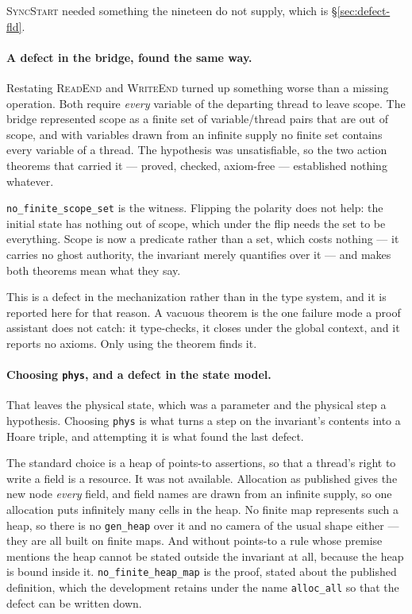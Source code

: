 \textsc{SyncStart} needed something the nineteen do not supply, which is
\S\ref{sec:defect-fld}.

\paragraph{A defect in the bridge, found the same way.}
Restating \textsc{ReadEnd} and \textsc{WriteEnd} turned up something worse than
a missing operation.  Both require \emph{every} variable of the departing
thread to leave scope.  The bridge represented scope as a finite set of
variable/thread pairs that are out of scope, and with variables drawn from an
infinite supply no finite set contains every variable of a thread.  The
hypothesis was unsatisfiable, so the two action theorems that carried it ---
proved, checked, axiom-free --- established nothing whatever.

\texttt{no\_finite\_scope\_set} is the witness.  Flipping the polarity does not
help: the initial state has nothing out of scope, which under the flip needs the
set to be everything.  Scope is now a predicate rather than a set, which costs
nothing --- it carries no ghost authority, the invariant merely quantifies over
it --- and makes both theorems mean what they say.

This is a defect in the mechanization rather than in the type system, and it is
reported here for that reason.  A vacuous theorem is the one failure mode a
proof assistant does not catch: it type-checks, it closes under the global
context, and it reports no axioms.  Only using the theorem finds it.

\paragraph{Choosing \texttt{phys}, and a defect in the state model.}
That leaves the physical state, which was a parameter and the physical step a
hypothesis.  Choosing \texttt{phys} is what turns a step on the invariant's
contents into a Hoare triple, and attempting it is what found the last defect.

The standard choice is a heap of points-to assertions, so that a thread's right
to write a field is a resource.  It was not available.  Allocation as published
gives the new node \emph{every} field, and field names are drawn from an
infinite supply, so one allocation puts infinitely many cells in the heap.  No
finite map represents such a heap, so there is no \texttt{gen\_heap} over it and
no camera of the usual shape either --- they are all built on finite maps.  And
without points-to a rule whose premise mentions the heap cannot be stated
outside the invariant at all, because the heap is bound inside it.
\texttt{no\_finite\_heap\_map} is the proof, stated about the published
definition, which the development retains under the name \texttt{alloc\_all} so
that the defect can be written down.

